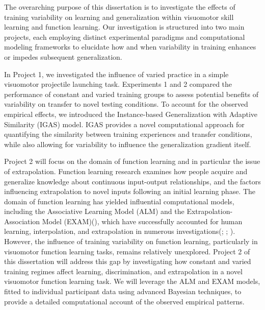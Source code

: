 \documentclass[
  11pt,
  letterpaper,
]{article}
\begin{document}
The overarching purpose of this dissertation is to investigate the
effects of training variability on learning and generalization within
visuomotor skill learning and function learning. Our investigation is
structured into two main projects, each employing distinct experimental
paradigms and computational modeling frameworks to elucidate how and
when variability in training enhances or impedes subsequent
generalization.

In Project 1, we investigated the influence of varied practice in a
simple visuomotor projectile launching task. Experiments 1 and 2
compared the performance of constant and varied training groups to
assess potential benefits of variability on transfer to novel testing
conditions. To account for the observed empirical effects, we introduced
the Instance-based Generalization with Adaptive Similarity (IGAS) model.
IGAS provides a novel computational approach for quantifying the
similarity between training experiences and transfer conditions, while
also allowing for variability to influence the generalization gradient
itself.

Project 2 will focus on the domain of function learning and in
particular the issue of extrapolation. Function learning research
examines how people acquire and generalize knowledge about continuous
input-output relationships, and the factors influencing extrapolation to
novel inputs following an initial learning phase. The domain of function
learning has yielded influential computational models, including the
Associative Learning Model (ALM) and the Extrapolation-Association Model
(EXAM)(), which have successfully accounted for human learning,
interpolation, and extrapolation in numerous
investigations(;
; ). However, the influence of training variability on
function learning, particularly in visuomotor function learning tasks,
remains relatively unexplored. Project 2 of this dissertation will
address this gap by investigating how constant and varied training
regimes affect learning, discrimination, and extrapolation in a novel
visuomotor function learning task. We will leverage the ALM and EXAM
models, fitted to individual participant data using advanced Bayesian
techniques, to provide a detailed computational account of the observed
empirical patterns.
\end{document}
